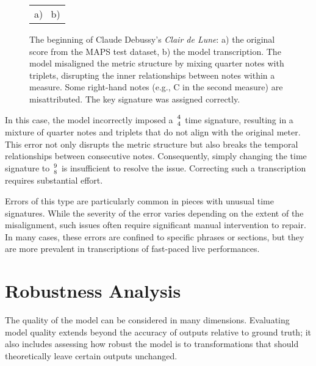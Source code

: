 \begin{figure}[ht!] \centering \begin{tabular}{c}a)  \ b)  \end{tabular} \caption[Claude Debussy's \emph{Clair de Lune}.]{The beginning of Claude Debussy's \emph{Clair de Lune}: a) the original score from the MAPS test dataset, b) the model transcription. The model misaligned the metric structure by mixing quarter notes with triplets, disrupting the inner relationships between notes within a measure. Some right-hand notes (e.g., C in the second measure) are misattributed. The key signature was assigned correctly.} \label{claire_de_lune} \end{figure}

In this case, the model incorrectly imposed a ${4 \atop 4}$ time signature, resulting in a mixture of quarter notes and triplets that do not align with the original meter. This error not only disrupts the metric structure but also breaks the temporal relationships between consecutive notes. Consequently, simply changing the time signature to ${9 \atop 8}$ is insufficient to resolve the issue. Correcting such a transcription requires substantial effort.

Errors of this type are particularly common in pieces with unusual time signatures. While the severity of the error varies depending on the extent of the misalignment, such issues often require significant manual intervention to repair. In many cases, these errors are confined to specific phrases or sections, but they are more prevalent in transcriptions of fast-paced live performances.

\section{Robustness Analysis} \label{robustness_analysis}

The quality of the model can be considered in many dimensions. Evaluating model quality extends beyond the accuracy of outputs relative to ground truth; it also includes assessing how robust the model is to transformations that should theoretically leave certain outputs unchanged.

